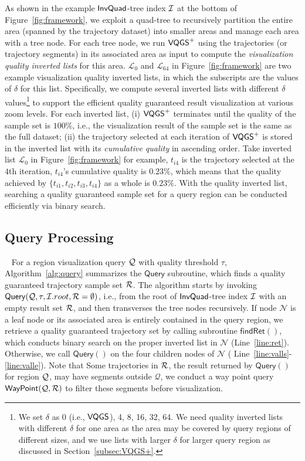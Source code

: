 As shown in the example $\mathsf{InvQuad}$-tree index $\mathcal{I}$ at the bottom of Figure~\ref{fig:framework}, we exploit a quad-tree to recursively partition the entire area (spanned by the trajectory dataset) into smaller areas and manage each area with a tree node.
For each tree node, we run $\mathsf{VQGS}^+$ using the trajectories (or trajectory segments) in its associated area as input to compute the \textit{visualization quality inverted lists} for this area. $\mathcal{L}_0$ and $\mathcal{L}_{64}$ in Figure~\ref{fig:framework} are two example visualization quality inverted lists, in which the subscripts are the values of $\delta$ for this list.
Specifically, we compute several inverted lists with different $\delta$ values\footnote{We set $\delta$ as 0 (i.e., $\mathsf{VQGS}$), 4, 8, 16, 32, 64. We need quality inverted lists with different $\delta$ for one area as the area may be covered by query regions of different sizes, and we use lists with larger $\delta$ for larger query region as discussed in Section~\ref{subsec:VQGS+}.} to support the efficient quality guaranteed result visualization at various zoom levels.
For each inverted list, (i) $\mathsf{VQGS}^+$ terminates until the quality of the sample set is $100\%$, i.e., the visualization result of the sample set is the same as the full dataset;
(ii) the trajectory selected at each iteration of $\mathsf{VQGS}^+$ is stored in the inverted list with its \textit{cumulative quality} in ascending order. Take inverted list $\mathcal{L}_0$ in Figure~\ref{fig:framework} for example, $t_{i4}$ is the trajectory selected at the $4$th iteration,
$t_{i4}$'s cumulative quality is $0.23\%$, which means that the quality achieved by $\{t_{i1}, t_{i2}, t_{i3}, t_{i4}\}$ as a whole is $0.23\%$. With the quality inverted list, searching a quality guaranteed sample set for a query region can be conducted efficiently via binary search.


\subsection{Query Processing}~\label{sec:query}
For a region visualization query $\mathcal{Q}$ with quality threshold $\tau$, Algorithm~\ref{alg:query} summarizes the $\mathsf{Query}$ subroutine, which finds a quality guaranteed trajectory sample set $\mathcal{R}$. The algorithm starts by invoking $\mathsf{Query}(\mathcal{Q}, \tau, \mathcal{I}.root, \mathcal{R}=\emptyset)$, i.e., from the root of $\mathsf{InvQuad}$-tree index $\mathcal{I}$ with an empty result set $\mathcal{R}$, and then transverses the tree nodes recursively. If node   $\mathcal{N}$ is a leaf node or its associated area is entirely contained in the query region, we retrieve a quality guaranteed trajectory set by calling subroutine $\mathsf{findRet}()$, which conducts binary search on the proper inverted list in $\mathcal{N}$ (Line~\ref{line:ret}). Otherwise, we call $\mathsf{Query}()$ on the four children nodes of $\mathcal{N}$ ( Line~\ref{line:valls}-\ref{line:valle}). Note that Some trajectories in $\mathcal{R}$, the result returned by $\mathsf{Query}()$ for region $\mathcal{Q}$, may have segments outside $\mathcal{Q}$,
we conduct a way point query $\mathsf{WayPoint}(\mathcal{Q}, \mathcal{R})$ to filter these segments before visualization.


